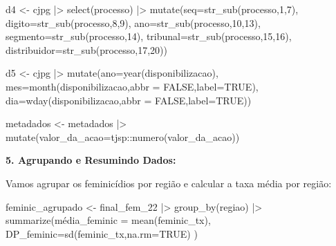 \documentclass[
  letterpaper,
  DIV=11,
  numbers=noendperiod]{scrreprt}
\newenvironment{Shaded}{\begin{snugshade}}{\end{snugshade}}
\newcommand{\AttributeTok}[1]{\textcolor[rgb]{0.40,0.45,0.13}{#1}}
\newcommand{\ConstantTok}[1]{\textcolor[rgb]{0.56,0.35,0.01}{#1}}
\newcommand{\DecValTok}[1]{\textcolor[rgb]{0.68,0.00,0.00}{#1}}
\newcommand{\FunctionTok}[1]{\textcolor[rgb]{0.28,0.35,0.67}{#1}}
\newcommand{\NormalTok}[1]{\textcolor[rgb]{0.00,0.23,0.31}{#1}}
\newcommand{\OtherTok}[1]{\textcolor[rgb]{0.00,0.23,0.31}{#1}}
\newcommand{\SpecialCharTok}[1]{\textcolor[rgb]{0.37,0.37,0.37}{#1}}
\begin{document}
\begin{Shaded}
\begin{Highlighting}[]
\NormalTok{d4 }\OtherTok{\textless{}{-}}\NormalTok{ cjpg }\SpecialCharTok{|\textgreater{}} 
  \FunctionTok{select}\NormalTok{(processo) }\SpecialCharTok{|\textgreater{}} 
  \FunctionTok{mutate}\NormalTok{(}\AttributeTok{seq=}\FunctionTok{str\_sub}\NormalTok{(processo,}\DecValTok{1}\NormalTok{,}\DecValTok{7}\NormalTok{),}
         \AttributeTok{digito=}\FunctionTok{str\_sub}\NormalTok{(processo,}\DecValTok{8}\NormalTok{,}\DecValTok{9}\NormalTok{),}
         \AttributeTok{ano=}\FunctionTok{str\_sub}\NormalTok{(processo,}\DecValTok{10}\NormalTok{,}\DecValTok{13}\NormalTok{),}
         \AttributeTok{segmento=}\FunctionTok{str\_sub}\NormalTok{(processo,}\DecValTok{14}\NormalTok{),}
         \AttributeTok{tribunal=}\FunctionTok{str\_sub}\NormalTok{(processo,}\DecValTok{15}\NormalTok{,}\DecValTok{16}\NormalTok{),}
         \AttributeTok{distribuidor=}\FunctionTok{str\_sub}\NormalTok{(processo,}\DecValTok{17}\NormalTok{,}\DecValTok{20}\NormalTok{))}

\NormalTok{d5 }\OtherTok{\textless{}{-}}\NormalTok{ cjpg }\SpecialCharTok{|\textgreater{}}
  \FunctionTok{mutate}\NormalTok{(}\AttributeTok{ano=}\FunctionTok{year}\NormalTok{(disponibilizacao),}
         \AttributeTok{mes=}\FunctionTok{month}\NormalTok{(disponibilizacao,}\AttributeTok{abbr =} \ConstantTok{FALSE}\NormalTok{,}\AttributeTok{label=}\ConstantTok{TRUE}\NormalTok{),}
         \AttributeTok{dia=}\FunctionTok{wday}\NormalTok{(disponibilizacao,}\AttributeTok{abbr =} \ConstantTok{FALSE}\NormalTok{,}\AttributeTok{label=}\ConstantTok{TRUE}\NormalTok{))}
  
\NormalTok{metadados }\OtherTok{\textless{}{-}}\NormalTok{ metadados }\SpecialCharTok{|\textgreater{}} 
  \FunctionTok{mutate}\NormalTok{(}\AttributeTok{valor\_da\_acao=}\NormalTok{tjsp}\SpecialCharTok{::}\FunctionTok{numero}\NormalTok{(valor\_da\_acao))}
\end{Highlighting}
\end{Shaded}

\textbf{5. Agrupando e Resumindo Dados:}

Vamos agrupar os feminicídios por região e calcular a taxa média por
região:

\begin{Shaded}
\begin{Highlighting}[]
\NormalTok{feminic\_agrupado }\OtherTok{\textless{}{-}}\NormalTok{ final\_fem\_22 }\SpecialCharTok{|\textgreater{}} 
  \FunctionTok{group\_by}\NormalTok{(regiao) }\SpecialCharTok{|\textgreater{}} 
 \FunctionTok{summarize}\NormalTok{(média}\AttributeTok{\_feminic =} \FunctionTok{mean}\NormalTok{(feminic\_tx), }
           \AttributeTok{DP\_feminic=}\FunctionTok{sd}\NormalTok{(feminic\_tx,}\AttributeTok{na.rm=}\ConstantTok{TRUE}\NormalTok{)}
\NormalTok{           )}
\end{Highlighting}
\end{Shaded}
\end{document}
